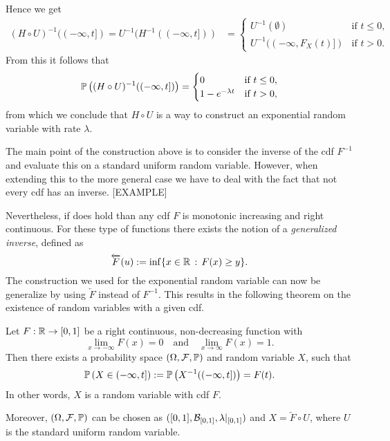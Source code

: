 Hence we get
\begin{align*}
	(H \circ U)^{-1}((-\infty, t]) = U^{-1}(H^{-1}((-\infty, t]))
	&= \begin{cases}
		U^{-1}(\emptyset) &\text{if } t \le 0,\\
		U^{-1}((-\infty, F_X(t)]) &\text{if } t > 0.
	\end{cases}
\end{align*}
From this it follows that 
\[
	\mathbb P\left((H \circ U)^{-1}((-\infty, t])\right) = \begin{cases}
			0 &\text{if } t \le 0,\\
			1-e^{-\lambda t} &\text{if } t > 0,
		\end{cases}
\]
from which we conclude that $H \circ U$ is a way to construct an exponential random variable with rate $\lambda$.

The main point of the construction above is to consider the inverse of the cdf $F^{-1}$ and evaluate this on a standard uniform random variable. However, when extending this to the more general case we have to deal with the fact that not every cdf has an inverse. [EXAMPLE]

Nevertheless, if does hold than any cdf $F$ is monotonic increasing and right continuous. For these type of functions there exists the notion of a \emph{generalized inverse}, defined as
\begin{equation}
	\overleftarrow{F}(u) := \inf\{ x \in \mathbb R \, : \, F(x) \ge y\}. 
\end{equation}
The construction we used for the exponential random variable can now be generalize by using $\overleftarrow{F}$ instead of $F^{-1}$. This results in the following theorem on the existence of random variables with a given cdf.

\begin{theorem}\label{thm:construction_random_variable}
Let $F : \mathbb R \to [0,1]$ be a right continuous, non-decreasing function with 
\[
	\lim_{x \to -\infty} F(x) = 0 \quad \text{and} \quad \lim_{x \to \infty} F(x) = 1.
\]
Then there exists a probability space  $(\Omega,\mathcal F, \mathbb P)$ and random variable $X$, such that 
\[
	\mathbb P\left(X \in (-\infty,t]\right) := \mathbb P\left(X^{-1}((-\infty,t])\right) = F(t).
\]
In other words, $X$ is a random variable with cdf $F$.

Moreover, $(\Omega,\mathcal F, \mathbb P)$ can be chosen as $([0,1], \mathcal B_{[0,1]}, \lambda|_{[0,1]})$ and $X = \overleftarrow{F}\circ U$, where $U$ is the standard uniform random variable.
\end{theorem}

